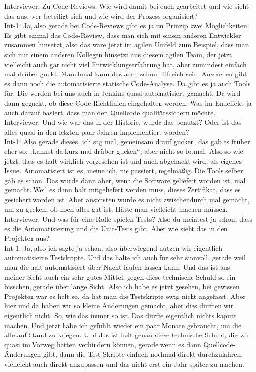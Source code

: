 Interviewer: Zu Code-Reviews: Wie wird damit bei euch gearbeitet und wie sieht das aus, wer beteiligt sich und wie wird der Prozess organisiert?\\
Int-1: Ja, also gerade bei Code-Reviews gibt es ja im Prinzip zwei Möglichkeiten: Es gibt einmal das Code-Review, dass man sich mit einem anderen Entwickler zusammen hinsetzt, also das wäre jetzt im agilen Umfeld zum Beispiel, dass man sich mit einem anderen Kollegen hinsetzt aus diesem agilen Team, der jetzt vielleicht auch gar nicht viel Entwicklungserfahrung hat, aber zumindest einfach mal drüber guckt. Manchmal kann das auch schon hilfreich sein. Ansonsten gibt es dann noch die automatisierte statische Code-Analyse. Da gibt es ja auch Tools für. Die werden bei uns auch in Jenkins quasi automatisiert gemacht. Da wird dann geguckt, ob diese Code-Richtlinien eingehalten werden. Was im Endeffekt ja auch darauf basiert, dass man den Quellcode qualitätssichern möchte.\\
Interviewer: Und wie war das in der Historie, wurde das benutzt? Oder ist das alles quasi in den letzten paar Jahren implementiert worden?\\
Int-1: Also gerade dieses, ich sag mal, gemeinsam drauf gucken, das gab es früher eher so: „kannst da kurz mal drüber gucken“, aber nicht so formal. Also so wie jetzt, dass es halt wirklich vorgesehen ist und auch abgehackt wird, als eigenes Issue. Automatisiert ist es, meine ich, nie passiert, regelmäßig. Die Tools selber gab es schon. Das wurde dann aber, wenn die Software geliefert worden ist, mal gemacht. Weil es dann halt mitgeliefert werden muss, dieses Zertifikat, dass es gesichert worden ist. Aber ansonsten wurde es nicht zwischendurch mal gemacht, um zu gucken, ob noch alles gut ist. Hätte man vielleicht machen müssen.\\
Interviewer: Und was für eine Rolle spielen Tests? Also du meintest ja schon, dass es die Automatisierung und die Unit-Tests gibt. Aber wie sieht das in den Projekten aus?\\
Int-1: Ja, also ich sagte ja schon, also überwiegend nutzen wir eigentlich automatisierte Testskripte. Und das halte ich auch für sehr sinnvoll, gerade weil man die halt automatisiert über Nacht laufen lassen kann. Und das ist aus meiner Sicht auch ein sehr gutes Mittel, gegen diese technische Schuld so ein bisschen, gerade über lange Sicht. Also ich habe es jetzt gesehen, bei gewissen Projekten war es halt so, da hat man die Testskripte ewig nicht angefasst. Aber hier und da haben wir so kleine Änderungen gemacht, aber dies dürften wir eigentlich nicht. So, wie das immer so ist. Das dürfte eigentlich nichts kaputt machen. Und jetzt habe ich gefühlt wieder ein paar Monate gebraucht, um die alle auf Stand zu kriegen. Und das ist halt genau diese technische Schuld, die wir quasi im Vorweg hätten verhindern können, gerade wenn es dann Quellcode-Änderungen gibt, dann die Test-Skripte einfach nochmal direkt durchzufahren, vielleicht auch direkt anzupassen und das nicht erst ein Jahr später zu machen.\\
